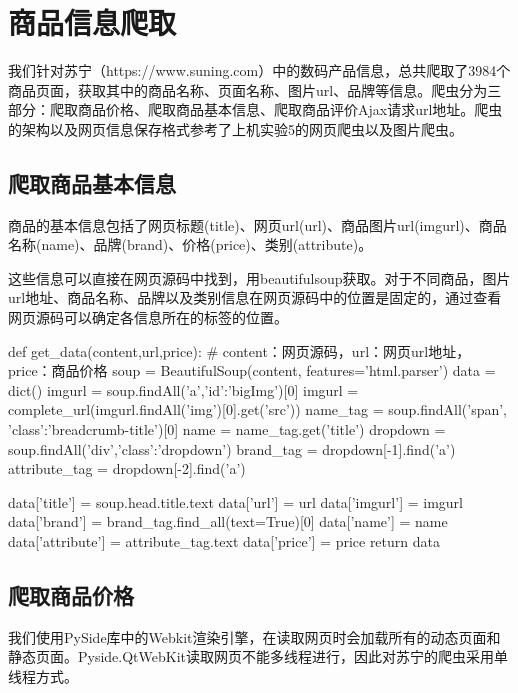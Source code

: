 \section{商品信息爬取}

我们针对苏宁（https://www.suning.com）中的数码产品信息，总共爬取了3984个商品页面，获取其中的商品名称、页面名称、图片url、品牌等信息。爬虫分为三部分：爬取商品价格、爬取商品基本信息、爬取商品评价Ajax请求url地址。爬虫的架构以及网页信息保存格式参考了上机实验5的网页爬虫以及图片爬虫。

\subsection{爬取商品基本信息}

商品的基本信息包括了网页标题(title)、网页url(url)、商品图片url(imgurl)、商品名称(name)、品牌(brand)、价格(price)、类别(attribute)。

这些信息可以直接在网页源码中找到，用beautifulsoup获取。对于不同商品，图片url地址、商品名称、品牌以及类别信息在网页源码中的位置是固定的，通过查看网页源码可以确定各信息所在的标签的位置。

\begin{python}
def get_data(content,url,price): # content：网页源码，url：网页url地址，price：商品价格
    soup = BeautifulSoup(content, features='html.parser')
    data = dict()
    imgurl = soup.findAll('a',{'id':'bigImg'})[0]
    imgurl = complete_url(imgurl.findAll('img')[0].get('src'))
    name_tag = soup.findAll('span', {'class':'breadcrumb-title'})[0]
    name = name_tag.get('title')
    dropdown = soup.findAll('div',{'class':'dropdown'})
    brand_tag = dropdown[-1].find('a')
    attribute_tag = dropdown[-2].find('a')

    data['title'] = soup.head.title.text
    data['url'] = url
    data['imgurl'] = imgurl
    data['brand'] = brand_tag.find_all(text=True)[0]
    data['name'] = name
    data['attribute'] = attribute_tag.text
    data['price'] = price
    return data
\end{python}

\subsection{爬取商品价格}

我们使用PySide库中的Webkit渲染引擎，在读取网页时会加载所有的动态页面和静态页面。Pyside.QtWebKit读取网页不能多线程进行，因此对苏宁的爬虫采用单线程方式。

